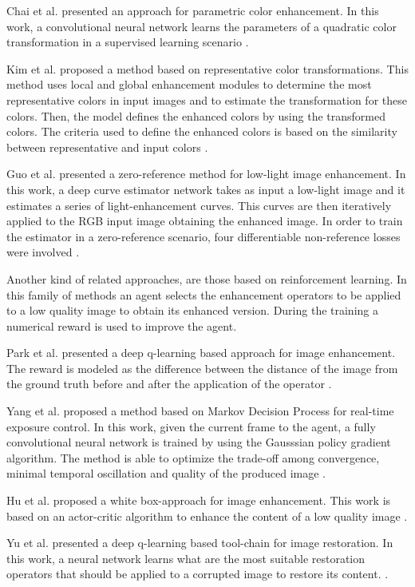 \documentclass[3p,twocolumn]{elsarticle}
\begin{document}
Chai et al. presented an approach for parametric color enhancement. In this work, a convolutional neural network learns the parameters of a quadratic color transformation in a supervised learning scenario \cite{chai2020supervised}.

Kim et al. proposed a method based on representative color transformations. This method uses local and global enhancement modules to determine the most representative colors in input images and to estimate the transformation for these colors. Then, the model defines the enhanced colors by using the transformed colors. The criteria used to define the enhanced colors is based on the similarity between representative and input colors \cite{kim2021representative}.

Guo et al. presented a zero-reference method for low-light image enhancement. In this work, a deep curve estimator network takes as input a low-light image and it estimates a series of light-enhancement curves. This curves are then iteratively applied to the RGB input image obtaining the enhanced image. In order to train the estimator in a zero-reference scenario, four differentiable non-reference losses were involved \cite{guo2020zero}.

Another kind of related approaches, are those based on reinforcement learning. In this family of methods an agent selects the enhancement operators to be applied to a low quality image to obtain its enhanced version. During the training a numerical reward is used to improve the agent. 

Park et al. presented a deep q-learning based approach for image enhancement. The reward is modeled as the difference between the distance of the image from the ground truth before and after the application of the operator \cite{park2018distort}.

Yang et al. proposed a method based on Markov Decision Process for real-time exposure control. In this work, given the current frame to the agent, a fully convolutional neural network is trained by using the Gausssian policy gradient algorithm.  The method is able to optimize the trade-off among convergence, minimal temporal oscillation and quality of the produced image \cite{yang2018personalized}.

Hu et al. proposed a white box-approach for image enhancement. This work is based on an actor-critic algorithm to enhance the content of a low quality image \cite{hu2018exposure}. 

Yu et al. presented a deep q-learning based tool-chain for image restoration. In this work, a neural network learns what are the most suitable restoration operators that should be applied to a corrupted image to restore its content. \cite{yu2018crafting}.
\end{document}
